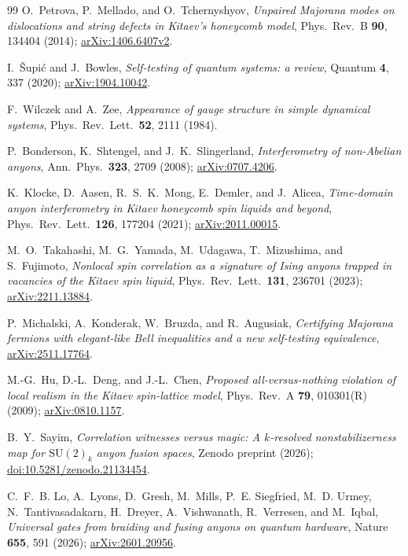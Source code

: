 \documentclass[aps,pra,twocolumn,superscriptaddress,floatfix,nofootinbib]{revtex4-2}
\begin{document}
\begin{thebibliography}{99}
O.~Petrova, P.~Mellado, and O.~Tchernyshyov,
\emph{Unpaired Majorana modes on dislocations and string defects in
Kitaev's honeycomb model},
Phys.\ Rev.\ B \textbf{90}, 134404 (2014);
\href{https://arxiv.org/abs/1406.6407v2}{arXiv:1406.6407v2}.

I.~\v{S}upi\'c and J.~Bowles,
\emph{Self-testing of quantum systems: a review},
Quantum \textbf{4}, 337 (2020);
\href{https://arxiv.org/abs/1904.10042}{arXiv:1904.10042}.

F.~Wilczek and A.~Zee,
\emph{Appearance of gauge structure in simple dynamical systems},
Phys.\ Rev.\ Lett.\ \textbf{52}, 2111 (1984).

P.~Bonderson, K.~Shtengel, and J.~K.~Slingerland,
\emph{Interferometry of non-Abelian anyons},
Ann.\ Phys.\ \textbf{323}, 2709 (2008);
\href{https://arxiv.org/abs/0707.4206}{arXiv:0707.4206}.

K.~Klocke, D.~Aasen, R.~S.~K.~Mong, E.~Demler, and J.~Alicea,
\emph{Time-domain anyon interferometry in Kitaev honeycomb spin
liquids and beyond},
Phys.\ Rev.\ Lett.\ \textbf{126}, 177204 (2021);
\href{https://arxiv.org/abs/2011.00015}{arXiv:2011.00015}.

M.~O.~Takahashi, M.~G.~Yamada, M.~Udagawa, T.~Mizushima, and S.~Fujimoto,
\emph{Nonlocal spin correlation as a signature of Ising anyons
trapped in vacancies of the Kitaev spin liquid},
Phys.\ Rev.\ Lett.\ \textbf{131}, 236701 (2023);
\href{https://arxiv.org/abs/2211.13884}{arXiv:2211.13884}.

P.~Michalski, A.~Konderak, W.~Bruzda, and R.~Augusiak,
\emph{Certifying Majorana fermions with elegant-like Bell inequalities
and a new self-testing equivalence},
\href{https://arxiv.org/abs/2511.17764}{arXiv:2511.17764}.

M.-G.~Hu, D.-L.~Deng, and J.-L.~Chen,
\emph{Proposed all-versus-nothing violation of local realism in the
Kitaev spin-lattice model},
Phys.\ Rev.\ A \textbf{79}, 010301(R) (2009);
\href{https://arxiv.org/abs/0810.1157}{arXiv:0810.1157}.

B.~Y.~Sayim,
\emph{Correlation witnesses versus magic: A $k$-resolved
nonstabilizerness map for $\mathrm{SU}(2)_k$ anyon fusion spaces},
Zenodo preprint (2026);
\href{https://doi.org/10.5281/zenodo.21134454}{doi:10.5281/zenodo.21134454}.

C.~F.~B. Lo, A.~Lyons, D.~Gresh, M.~Mills, P.~E. Siegfried, M.~D. Urmey,
N.~Tantivasadakarn, H.~Dreyer, A.~Vishwanath, R.~Verresen, and M.~Iqbal,
\emph{Universal gates from braiding and fusing anyons on quantum hardware},
Nature \textbf{655}, 591 (2026);
\href{https://arxiv.org/abs/2601.20956}{arXiv:2601.20956}.

\end{thebibliography}
\end{document}
